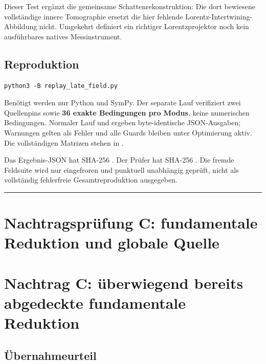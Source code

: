 Dieser Test ergänzt die gemeinsame Schattenrekonstruktion: Die dort
bewiesene vollständige innere Tomographie ersetzt die hier fehlende
Lorentz-Intertwining-Abbildung nicht. Umgekehrt definiert ein richtiger
Lorentzprojektor noch kein ausführbares natives Messinstrument.

\subsection{Reproduktion}\label{reproduktion}

\begin{verbatim}
python3 -B replay_late_field.py
\end{verbatim}

Benötigt werden nur Python und SymPy. Der separate Lauf verifiziert zwei
Quellenpins sowie \textbf{36 exakte Bedingungen pro Modus}, keine
numerischen Bedingungen. Normaler Lauf und  ergeben
byte-identische JSON-Ausgaben; Warnungen gelten als Fehler und alle
Guards bleiben unter Optimierung aktiv. Die vollständigen Matrizen
stehen in .

Das Ergebnis-JSON hat SHA-256
.
Der Prüfer hat SHA-256
.
Die fremde Feldsuite wird nur eingefroren und punktuell unabhängig
geprüft, nicht als vollständig fehlerfreie Gesamtreproduktion
ausgegeben.

\begin{center}\rule{0.5\linewidth}{0.5pt}\end{center}

\section{Nachtragsprüfung C: fundamentale Reduktion und globale
Quelle}\label{nachtragspruxfcfung-c-fundamentale-reduktion-und-globale-quelle}

\section{Nachtrag C: überwiegend bereits abgedeckte fundamentale
Reduktion}\label{nachtrag-c-uxfcberwiegend-bereits-abgedeckte-fundamentale-reduktion}

\subsection{Übernahmeurteil}\label{uxfcbernahmeurteil}

